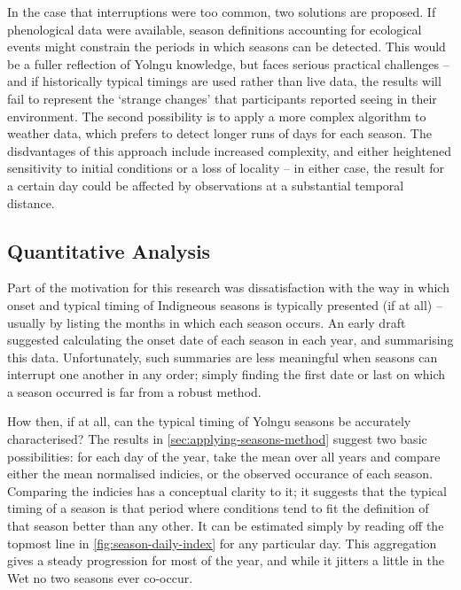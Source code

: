 In the case that interruptions were too common, two solutions are proposed.
If phenological data were available, season definitions accounting for
ecological events might constrain the periods in which seasons can be detected.
This would be a fuller reflection of Yolngu knowledge, but faces serious
practical challenges -- and if historically typical timings are used rather
than live data, the results will fail to represent the `strange changes'
that participants reported seeing in their environment.
%
The second  possibility is to apply a more complex algorithm to weather data,
which prefers to detect longer runs of days for each season.  The disdvantages
of this approach include increased complexity, and either heightened sensitivity
to initial conditions or a loss of locality -- in either case, the result for
a certain day could be affected by observations at a substantial temporal distance.


\subsection{Quantitative Analysis}
\label{subsec:disc-season-characterisation}

Part of the motivation for this research was dissatisfaction with the way in
which onset and typical timing of Indigneous seasons is typically presented
(if at all) -- usually by listing the months in which each season occurs.
%
An early draft suggested calculating the onset date of each season in each
year, and summarising this data.  Unfortunately, such summaries are less
meaningful when seasons can interrupt one another in any order; simply finding
the first date or last on which a season occurred is far from a robust method.

How then, if at all, can the typical timing of Yolngu seasons be accurately
characterised?  The results in \cref{sec:applying-seasons-method} suggest two
basic possibilities: for each day of the year, take the mean over all years
and compare either the mean normalised indicies, or the observed occurance
of each season.
%
Comparing the indicies has a conceptual clarity to it; it suggests that the
typical timing of a season is that period where conditions tend to fit the
definition of that season better than any other.  It can be estimated simply
by reading off the topmost line in \cref{fig:season-daily-index} for any
particular day.  This aggregation gives a steady progression for most of the
year, and while it jitters a little in the Wet no two seasons ever co-occur.

